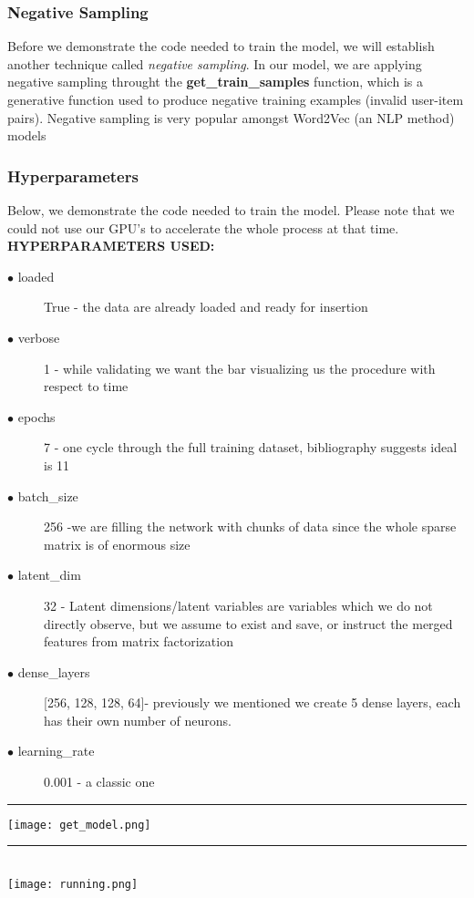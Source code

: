 \documentclass[]{article}
\begin{document}
\subsubsection{Negative Sampling}
Before we demonstrate the code needed to train the model, we will establish another technique called \textit{negative sampling}. In our model, we are applying negative sampling throught the  \textbf{get\_train\_samples} function, which is a generative function used to produce negative training examples (invalid user-item pairs). Negative sampling is very popular amongst Word2Vec (an NLP method) models \cite{Rossi}

\subsubsection{Hyperparameters}
Below, we demonstrate the code needed to train the model. Please note that we could not use our GPU's to accelerate the whole process at that time. \textbf{HYPERPARAMETERS USED:} \begin{description}
	\item [$\bullet$ loaded] True - the data are already loaded and ready for insertion
	\item [$\bullet$ verbose] 1 - while validating we want the bar visualizing us the procedure with respect to time
	\item [$\bullet$ epochs] 7 - one cycle through the full training dataset, bibliography suggests ideal is 11
	\item [$\bullet$ batch\_size] 256 -we are filling the network with chunks of data since the whole sparse matrix is of enormous size
	\item [$\bullet$ latent\_dim] 32 - Latent dimensions/latent variables are variables which we do not directly observe, but we assume to exist and save, or instruct the merged features from matrix factorization 
	\item [$\bullet$ dense\_layers] [256, 128, 128, 64]- previously we mentioned we create 5 dense layers, each has their own number of neurons.
	\item [$\bullet$ learning\_rate] 0.001 - a classic one
\end{description}

\noindent
{\color{Blue} \rule{\linewidth}{0.5mm}}
\texttt{[image: get\_model.png]}
\noindent
{\color{Blue} \rule{\linewidth}{0.5mm}}
\\
\texttt{[image: running.png]}
\end{document}

